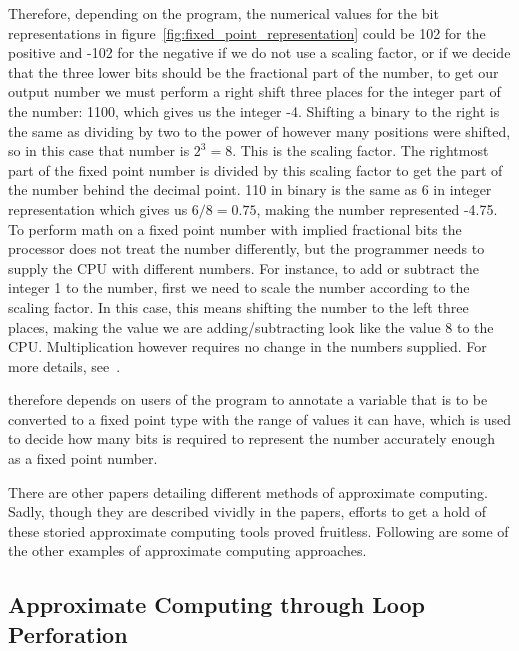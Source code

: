 Therefore, depending on the program, the numerical values for the bit representations in figure~\ref{fig:fixed_point_representation} could be 102 for the positive and -102 for the negative if we do not use a scaling factor, or if we decide that the three lower bits should be the fractional part of the number, to get our output number we must perform a right shift three places for the integer part of the number: 1100, which gives us the integer -4. Shifting a binary to the right is the same as dividing by two to the power of however many positions were shifted, so in this case that number is $2^3 = 8$. This is the scaling factor. The rightmost part of the fixed point number is divided by this scaling factor to get the part of the number behind the decimal point. 110 in binary is the same as 6 in integer representation which gives us $6/8 = 0.75$, making the number represented -4.75. To perform math on a fixed point number with implied fractional bits the processor does not treat the number differently, but the programmer needs to supply the CPU with different numbers. For instance, to add or subtract the integer 1 to the number, first we need to scale the number according to the scaling factor. In this case, this means shifting the number to the left three places, making the value we are adding/subtracting look like the value 8 to the CPU. Multiplication however requires no change in the numbers supplied.  For more details, see~\citet{yates2009fixed}.

\taffo{} therefore depends on users of the program to annotate a variable that is to be converted to a fixed point type with the range of values it can have, which is used to decide how many bits is required to represent the number accurately enough as a fixed point number. 


There are other papers detailing different methods of approximate computing. Sadly, though they are described vividly in the papers, efforts to get a hold of these storied approximate computing tools proved fruitless. Following are some of the other examples of approximate computing approaches.

\subsection{Approximate Computing through Loop Perforation}

